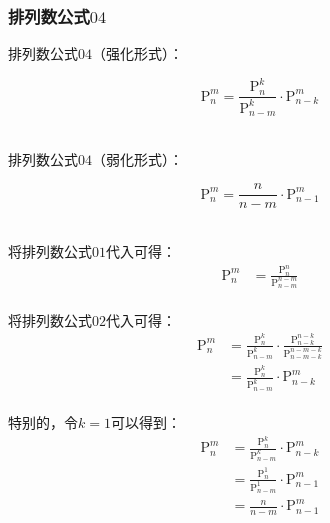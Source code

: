 \documentclass[UTF8]{ctexart}
\begin{document}
\subsubsection{排列数公式$04$}
    排列数公式$04$（强化形式）：
    \begin{large}
        \begin{equation*}
            \mathrm{P}_n^m=\frac{\mathrm{P}_n^k}{\mathrm{P}_{n-m}^k}\cdot\mathrm{P}_{n-k}^{m}
        \end{equation*}
    \end{large}\\
    排列数公式$04$（弱化形式）：
    \begin{large}
        \begin{equation*}
            \mathrm{P}_n^m=\frac{n}{n-m}\cdot\mathrm{P}_{n-1}^{m}
        \end{equation*}
    \end{large}\\
    将排列数公式$01$代入可得：
    \setcounter{equation}{0}
    \begin{align}
        \mathrm{P}_n^m&=\frac{\mathrm{P}_n^n}{\mathrm{P}_{n-m}^{n-m}}
    \end{align}\\
    将排列数公式$02$代入可得：
    \begin{align}
        \mathrm{P}_n^m
        &=\frac{\mathrm{P}_n^k}{\mathrm{P}_{n-m}^k}\cdot\frac{\mathrm{P}_{n-k}^{n-k}}{\mathrm{P}_{n-m-k}^{n-m-k}}\\[3mm]
        &=\frac{\mathrm{P}_n^k}{\mathrm{P}_{n-m}^k}\cdot\mathrm{P}_{n-k}^{m}
    \end{align}\\
    特别的，令$k=1$可以得到：
    \begin{align}
        \mathrm{P}_n^m
        &=\frac{\mathrm{P}_n^k}{\mathrm{P}_{n-m}^k}\cdot\mathrm{P}_{n-k}^{m}\\[3mm]
        &=\frac{\mathrm{P}_n^1}{\mathrm{P}_{n-m}^1}\cdot\mathrm{P}_{n-1}^{m}\\[3mm]
        &=\frac{n}{n-m}\cdot\mathrm{P}_{n-1}^{m}
    \end{align}

\newpage
\end{document}
